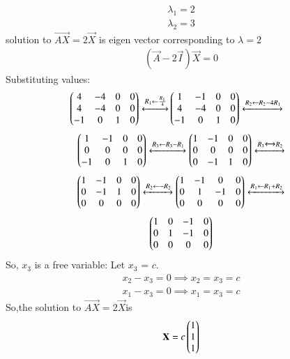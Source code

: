 \documentclass[journal,12pt,twocolumn]{IEEEtran}
\begin{document}
\begin{align}
 \lambda_1=2\\
 \lambda_2=3
 \end{align}
solution to $\vec{AX} =2\vec{X}$ is eigen vector corresponding to $\lambda=2$
\begin{align}
    (\vec{A}-2\vec{I})\vec X=0
\end{align}
Substituting values:
\begin{align}
\begin{pmatrix}4& -4&0&0\\
4 & -4 & 0&0\\
-1 & 0 &1&0
\end{pmatrix}
\xleftrightarrow[]{R_1 \leftarrow \frac{R_1}{4}} 
&
\begin{pmatrix}1&-1&0&0\\
4&-4&0&0\\
-1&0&1&0\end{pmatrix}
\xleftrightarrow[]{R_2 \leftarrow R_2-4R_1 } \nonumber 
\end{align}
\begin{align}
    \begin{pmatrix}1&-1&0&0\\
            0&0&0&0\\
            -1&0&1&0\end{pmatrix}
    \xleftrightarrow[]{R_3 \leftarrow R_3-R_1 }
    \begin{pmatrix}1&-1&0&0\\
            0&0&0&0\\
            0&-1&1&0\end{pmatrix}
    \xleftrightarrow[]{R_3 \xleftrightarrow[]{} R_2 } \nonumber
\end{align}
\begin{align}
    \begin{pmatrix}1&-1&0&0\\
    0&-1&1&0\\
    0&0&0&0\end{pmatrix}
    \xleftrightarrow[]{R_2 \leftarrow -R_2} 
    \begin{pmatrix}1&-1&0&0\\
    0&1&-1&0\\
    0&0&0&0\end{pmatrix}   
    \xleftrightarrow[]{R_1 \leftarrow R_1+R_2} \nonumber
\end{align}
\begin{align} \label{eq:eq_5}
    \begin{pmatrix}1&0&-1&0\\
    0&1&-1&0\\
    0&0&0&0\end{pmatrix} 
\end{align}
So, $x_3$ is a free variable: Let $x_3$ = $c$. 
\begin{align}
 {x_2}-{x_3}=0 \implies{x_2}={x_3}=c \\
 {x_1}-{x_3}=0 \implies{x_1}={x_3}=c 
 \end{align}
 So,the solution to $\vec{AX} =2\vec{X}$is
 \begin{align}\label{eq:555}
 \mathbf{X} = 
 c
 \begin{pmatrix}
 1\\1\\1
 \end{pmatrix}
\end{align}
\end{document}
